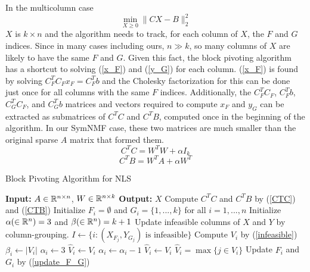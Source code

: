 In the multicolumn case 
\begin{equation} \label{multi_column_nls}
\min_{X \geq 0} \| C X - B \|_2^2
\end{equation}
$X$ is $k \times n$ and the algorithm needs to track, for each column of
$X$, the $F$ and $G$ indices. Since in many cases including ours,
$n \gg k$, so many columns of $X$ are likely to have the same $F$ and $G$.
Given this fact, the block pivoting algorithm has a shortcut to solving
(\ref{x_F}) and (\ref{y_G}) for each column. (\ref{x_F}) is found by solving
$C_F^T C_F x_F = C_F^T b$ and the Cholesky factorization for this can be done
just once for all columns with the same $F$ indices. Additionally, the
$C_F^T C_F$, $C_F^T b$, $C_G^T C_F$, and $C_G^T b$ matrices and vectors
required to compute $x_F$ and $y_G$ can be extracted as submatrices of $C^T C$
and $C^T B$, computed once in the beginning of the algorithm. In our SymNMF
case, these two matrices are much smaller than the original sparse $A$ matrix
that formed them.
\begin{equation} \label{CTC}
C^T C = W^T W + \alpha I_k
\end{equation}
\begin{equation} \label{CTB}
C^T B = W^T A + \alpha W^T
\end{equation}

\begin{algorithm}
\caption{Block Pivoting Algorithm for NLS}
\label{nls_alg}
\begin{algorithmic}
\State \textbf{Input:} $A \in \mathbb{R}^{n \times n}$, $W \in \mathbb{R}^{n \times k}$
\State \textbf{Output:} $X$
\State Compute $C^T C$ and $C^T B$ by (\ref{CTC}) and (\ref{CTB})
\State Initialize $F_i = \emptyset$ and $G_i = \{1, ..., k\}$
       for all $i = 1, ..., n$
\State Initialize $\alpha (\in \mathbb{R}^n) = 3$ and $\beta (\in \mathbb{R}^n) = k + 1$
\Repeat
  \State Update infeasible columns of $X$ and $Y$ by column-grouping.
  \State $I \gets \{i : (X_{F_j}, Y_{G_j}) \text{ is infeasible}\}$
    \State Compute $V_i$ by (\ref{infeasible})
      \State $\beta_i \gets |V_i|$
      \State $\alpha_i \gets 3$
      \State $\hat{V}_i \gets V_i$
      \State $\alpha_i \gets \alpha_i - 1$
      \State $\hat{V}_i \gets V_i$
      \State $\hat{V}_i = \max \{j \in V_i\}$
    \EndIf
    \State Update $F_i$ and $G_i$ by (\ref{update_F_G})
  \EndFor
{}
\end{algorithmic}
\end{algorithm}

